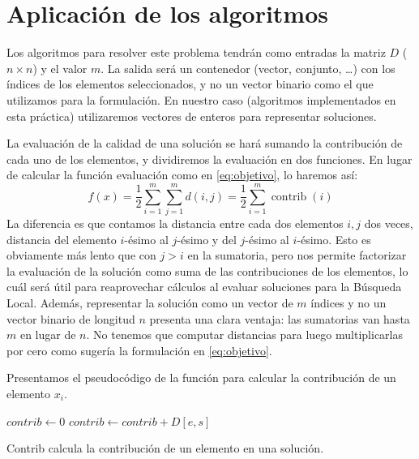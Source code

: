 \documentclass{article}
\begin{document}
\pagebreak

\section{Aplicación de los algoritmos}

Los algoritmos para resolver este problema tendrán como entradas la matriz $D$ ($n\times n$) y el valor $m$. La salida será un contenedor
(vector, conjunto, \ldots) con los índices de los elementos seleccionados, y no un vector binario como el que utilizamos para la formulación.
 En nuestro caso (algoritmos implementados en esta práctica) utilizaremos vectores de enteros para representar soluciones.

La evaluación de la calidad de una solución se hará
sumando la contribución de cada uno de los elementos, y dividiremos la evaluación en dos funciones. En lugar de calcular la función evaluación como en
\eqref{eq:objetivo}, lo haremos así:
\begin{equation} \label{eq:objetivo-fact}
f(x)=\frac{1}{2}\sum_{i=1}^{m}\sum_{j=1}^m d(i,j)=\frac{1}{2}\sum_{i=1}^{m}\operatorname{contrib}(i)
\end{equation}
La diferencia es que contamos la distancia entre cada dos elementos $i,j$ dos veces, distancia del elemento $i$-ésimo al $j$-ésimo y del $j$-ésimo al
$i$-ésimo. Esto es obviamente más lento que con $j>i$ en la sumatoria, pero nos permite factorizar la evaluación de la solución como suma de las
 contribuciones de los elementos, lo cuál será útil para reaprovechar cálculos al evaluar soluciones para la Búsqueda Local.
 Además, representar la solución como un vector de $m$ índices y no un vector binario de longitud $n$ presenta una clara ventaja: las sumatorias van hasta
 $m$ en lugar de $n$. No tenemos que computar distancias para luego multiplicarlas por cero como sugería la formulación en \eqref{eq:objetivo}.

Presentamos el pseudocódigo de la función para calcular la contribución de un elemento $x_i$.

\begin{algorithm}[H]
	\DontPrintSemicolon %
	$contrib \gets 0$\;
	 {
		$contrib \gets contrib + D[e,s]$ 
	}
	\;
	\caption{{\sc Contrib} calcula la contribución de un elemento en una solución.}
	\label{alg:contrib}
\end{algorithm}
\end{document}
